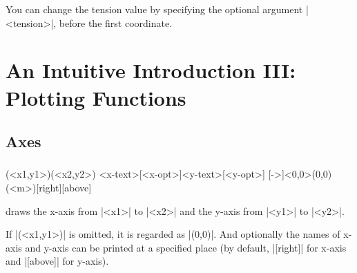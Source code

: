You can change the tension value by specifying the optional argument |{<tension>}|, before the first coordinate.

\begin{tzcode}{.3}
\end{tzcode}




\chapter{An Intuitive Introduction III: Plotting Functions}
\label{ci:introIII}


\section{Axes}
\label{si:axes}

\subsection{\protect\cmd{\tzaxes}}
\label{ssi:tzaxes}

\begin{tzdef}{}
(<x1,y1>)(<x2,y2>)
                               {<x-text>}[<x-opt>]{<y-text>}[<y-opt>]
  [->]<0,0>(0,0)(<m>){}[right]{}[above]
\end{tzdef}

\icmd{\tzaxes} draws the x-axis from |<x1>| to |<x2>| and the y-axis from |<y1>| to |<y2>|.

\begin{tzcode}{.3}
\end{tzcode}

If |(<x1,y1>)| is omitted, it is regarded as |(0,0)|.
And optionally the names of x-axis and y-axis can be printed at a specified place (by default, |[right]| for x-axis and |[above]| for y-axis).

